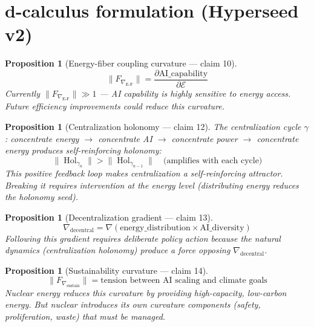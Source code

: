 \documentclass[11pt,a4paper]{article}
\newtheorem{proposition}[definition]{Proposition}
\begin{document}
\section{d-calculus formulation (Hyperseed v2)}

\begin{proposition}[Energy-fiber coupling curvature --- claim 10]
\label{prop:coupling}
\[
  \|F_{\nabla_{\text{E-F}}}\| = \frac{\partial \text{AI\_capability}}{\partial \mathcal{E}}
\]
Currently $\|F_{\nabla_{\text{E-F}}}\| \gg 1$ --- AI capability is
highly sensitive to energy access. Future efficiency improvements
could reduce this curvature.
\end{proposition}

\begin{proposition}[Centralization holonomy --- claim 12]
\label{prop:holonomy}
The centralization cycle $\gamma$: concentrate energy $\to$ concentrate
AI $\to$ concentrate power $\to$ concentrate energy produces
self-reinforcing holonomy:
\[
  \|\operatorname{Hol}_{\gamma_n}\| > \|\operatorname{Hol}_{\gamma_{n-1}}\|
  \quad \text{(amplifies with each cycle)}
\]
This positive feedback loop makes centralization a self-reinforcing
attractor. Breaking it requires intervention at the energy level
(distributing energy reduces the holonomy seed).
\end{proposition}

\begin{proposition}[Decentralization gradient --- claim 13]
\label{prop:gradient}
\[
  \nabla_{\text{decentral}} = \nabla(\text{energy\_distribution} \times
    \text{AI\_diversity})
\]
Following this gradient requires deliberate policy action because the
natural dynamics (centralization holonomy) produce a force opposing
$\nabla_{\text{decentral}}$.
\end{proposition}

\begin{proposition}[Sustainability curvature --- claim 14]
\label{prop:sustain}
\[
  \|F_{\nabla_{\text{sustain}}}\| = \text{tension between AI scaling and
    climate goals}
\]
Nuclear energy reduces this curvature by providing high-capacity,
low-carbon energy. But nuclear introduces its own curvature components
(safety, proliferation, waste) that must be managed.
\end{proposition}
\end{document}
